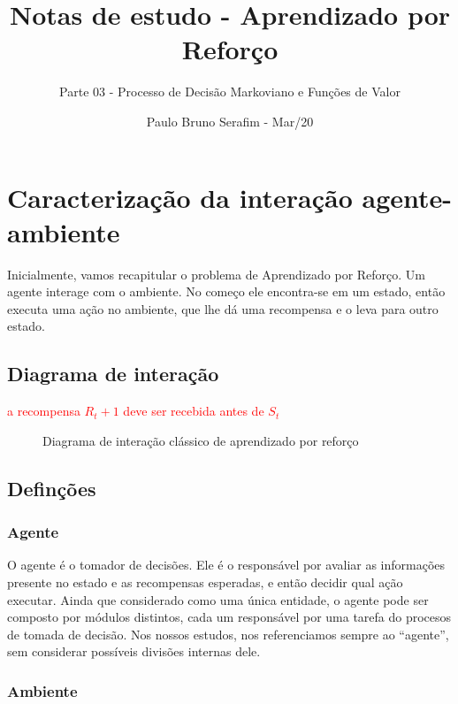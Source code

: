 \documentclass{article}
\title{Notas de estudo - Aprendizado por Reforço}
\author{Parte 03 - Processo de Decisão Markoviano e Funções de Valor}
\date{Paulo Bruno Serafim - Mar/20}
\begin{document}
\maketitle

    \section{Caracterização da interação agente-ambiente}
    
        Inicialmente, vamos recapitular o problema de Aprendizado por Reforço. Um agente interage com o ambiente. No começo ele encontra-se em um estado, então executa uma ação no ambiente, que lhe dá uma recompensa e o leva para outro estado. 
                
        \subsection{Diagrama de interação}
        
            \textcolor{red}{a recompensa $R_t+1$ deve ser recebida antes de $S_t$}
        
            \begin{figure}[ht]
                \centering
                \rlinteraction
                \caption{Diagrama de interação clássico de aprendizado por reforço}
                \label{diag:classical-rl}
            \end{figure}
    
        \subsection{Definções}
            
            \subsubsection{Agente}
            
                O agente é o tomador de decisões. Ele é o responsável por avaliar as informações presente no estado e as recompensas esperadas, e então decidir qual ação executar. Ainda que considerado como uma única entidade, o agente pode ser composto por módulos distintos, cada um responsável por uma tarefa do procesos de tomada de decisão. Nos nossos estudos, nos referenciamos sempre ao ``agente'', sem considerar possíveis divisões internas dele.
            
            \subsubsection{Ambiente}
            
\end{document}
